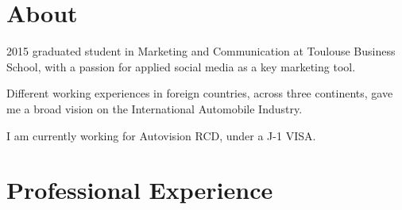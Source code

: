 \documentclass[]{cv}
\begin{document}


\footer{\today}





\section{About}

2015 graduated student in Marketing and Communication at Toulouse Business
School, with a passion for applied social media as a key marketing tool.

Different working experiences in foreign countries, across three
continents, gave me a broad vision on the International Automobile
Industry.

I am currently working for Autovision RCD, under a J-1 VISA.

\framebreak

\section{Professional Experience}
\end{document}
